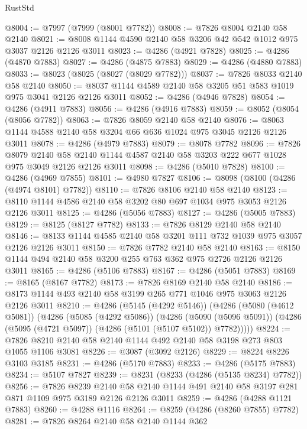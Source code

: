 \begin{lexlean}{RustStd}
\begin{coremodule}
@8004 := @7997 (@7999 (@8001 @7782))
@8008 := @7826 @8004 @2140 @58 @2140
@8021 := @8008 @1144 @4590 @2140 @58 @3206 @42 @542 @1012 @975 @3037 @2126 @2126 @3011
@8023 := @4286 (@4921 @7828)
@8025 := @4286 (@4870 @7883)
@8027 := @4286 (@4875 @7883)
@8029 := @4286 (@4880 @7883)
@8033 := @8023 (@8025 (@8027 (@8029 @7782)))
@8037 := @7826 @8033 @2140 @58 @2140
@8050 := @8037 @1144 @4589 @2140 @58 @3205 @51 @583 @1019 @975 @3041 @2126 @2126 @3011
@8052 := @4286 (@4946 @7828)
@8054 := @4286 (@4911 @7883)
@8056 := @4286 (@4916 @7883)
@8059 := @8052 (@8054 (@8056 @7782))
@8063 := @7826 @8059 @2140 @58 @2140
@8076 := @8063 @1144 @4588 @2140 @58 @3204 @66 @636 @1024 @975 @3045 @2126 @2126 @3011
@8078 := @4286 (@4979 @7883)
@8079 := @8078 @7782
@8096 := @7826
    @8079
    @2140
    @58
    @2140
    @1144
    @4587
    @2140
    @58
    @3203
    @222
    @677
    @1028
    @975
    @3049
    @2126
    @2126
    @3011
@8098 := @4286 (@5010 @7828)
@8100 := @4286 (@4969 @7855)
@8101 := @4980 @7827
@8106 := @8098 (@8100 (@4286 (@4974 @8101) @7782))
@8110 := @7826 @8106 @2140 @58 @2140
@8123 := @8110 @1144 @4586 @2140 @58 @3202 @80 @697 @1034 @975 @3053 @2126 @2126 @3011
@8125 := @4286 (@5056 @7883)
@8127 := @4286 (@5005 @7883)
@8129 := @8125 (@8127 @7782)
@8133 := @7826 @8129 @2140 @58 @2140
@8146 := @8133 @1144 @4585 @2140 @58 @3201 @111 @732 @1039 @975 @3057 @2126 @2126 @3011
@8150 := @7826 @7782 @2140 @58 @2140
@8163 := @8150 @1144 @494 @2140 @58 @3200 @255 @763 @362 @975 @2726 @2126 @2126 @3011
@8165 := @4286 (@5106 @7883)
@8167 := @4286 (@5051 @7883)
@8169 := @8165 (@8167 @7782)
@8173 := @7826 @8169 @2140 @58 @2140
@8186 := @8173 @1144 @493 @2140 @58 @3199 @265 @771 @1046 @975 @3063 @2126 @2126 @3011
@8210 := @4286
    (@5145 (@4292 @5146))
    (@4286
      (@5080 (@4612 @5081))
      (@4286
        (@5085 (@4292 @5086))
        (@4286
          (@5090 (@5096 @5091))
          (@4286 (@5095 (@4721 @5097)) (@4286 (@5101 (@5107 @5102)) @7782)))))
@8224 := @7826 @8210 @2140 @58 @2140 @1144 @492 @2140 @58 @3198 @273 @803 @1055 @1106 @3081
@8226 := @3087 (@3092 @2126)
@8229 := @8224 @8226 @3103 @3185
@8231 := @4286 (@5170 @7883)
@8233 := @4286 (@5175 @7883)
@8234 := @5107 @7827
@8239 := @8231 (@8233 (@4286 (@5135 @8234) @7782))
@8256 := @7826
    @8239
    @2140
    @58
    @2140
    @1144
    @491
    @2140
    @58
    @3197
    @281
    @871
    @1109
    @975
    @3189
    @2126
    @2126
    @3011
@8259 := @4286 (@4288 @1121 @7883)
@8260 := @4288 @1116
@8264 := @8259 (@4286 (@8260 @7855) @7782)
@8281 := @7826
    @8264
    @2140
    @58
    @2140
    @1144
    @362

\end{coremodule}
\end{lexlean}
